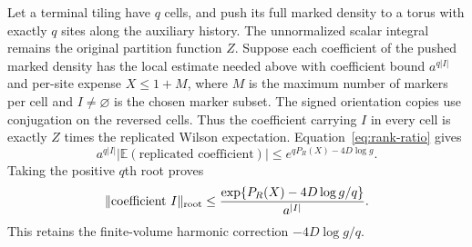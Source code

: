 Let a terminal tiling have $q$ cells, and push its full marked density
to a torus with exactly $q$ sites along the auxiliary history. The
unnormalized scalar integral remains the original partition function
$Z$. Suppose each coefficient of the pushed marked density has the
local estimate needed above with coefficient bound $a^{q|I|}$ and
per-site expense $X\le1+M$, where $M$ is the maximum number of markers
per cell and $I\ne\varnothing$ is the chosen marker subset. The signed
orientation copies use conjugation on the reversed cells. Thus the
coefficient carrying $I$ in every cell is exactly $Z$ times the
replicated Wilson expectation. Equation~\eqref{eq:rank-ratio} gives
\[
 a^{q|I|}|\mathbb E(\text{replicated coefficient})|
       \le e^{qP_R(X)-4D\log g}.
\]
Taking the positive $q$th root proves
\begin{equation}\label{eq:rank-root}
 \|\text{coefficient }I\|_{\rm root}
 \le\frac{\exp\{P_R(X)-4D\log g/q\}}{a^{|I|}}.
\end{equation}
This retains the finite-volume harmonic correction $-4D\log g/q$.

